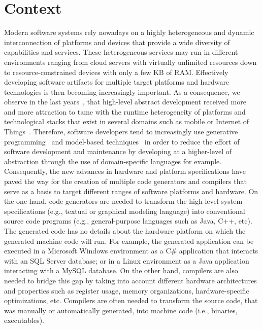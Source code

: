 

\section{Context}
Modern software systems rely nowadays on a highly heterogeneous and dynamic interconnection of platforms and devices that provide a wide diversity of capabilities and services. These heterogeneous services may run in different environments ranging from cloud servers with virtually unlimited resources down to resource-constrained devices with only a few KB of RAM. Effectively developing software artifacts for multiple target platforms and hardware technologies is then becoming increasingly important. As a consequence, we observe in the last years~\cite{Czarnecki:2000:GPM:345203}, that high-level abstract development received more and more attraction to tame with the runtime heterogeneity of platforms and technological stacks that exist in several domains such as mobile or Internet of Things~\cite{betz2011improving}.
Therefore, software developers tend to increasingly use generative programming~\cite{Czarnecki:2000:GPM:345203} and model-based techniques~\cite{france2007model} in order to reduce the effort of software development and maintenance by developing at a higher-level of abstraction through the use of domain-specific languages for example. 
Consequently, the new advances in hardware and platform specifications have paved the way for the creation of multiple code generators and compilers that serve as a basis to target different ranges of software platforms and hardware. 
On the one hand, code generators are needed to transform the high-level system specifications (e.g., textual or graphical modeling language) into conventional source code programs (e.g., general-purpose languages such as Java, C++, etc). The generated code has no details about the hardware platform on which the generated machine code will run. For example, the generated application can be executed in a Microsoft Windows environment as a C\# application that interacts with an SQL Server database; or in a Linux environment as a Java application interacting with a MySQL database. 
On the other hand, compilers are also needed to bridge this gap by taking into account different hardware architectures and properties such as register usage, memory organizations, hardware-specific optimizations, etc. Compilers are often needed to transform the source code, that was manually or automatically generated, into machine code (i.e., binaries, executables). 



